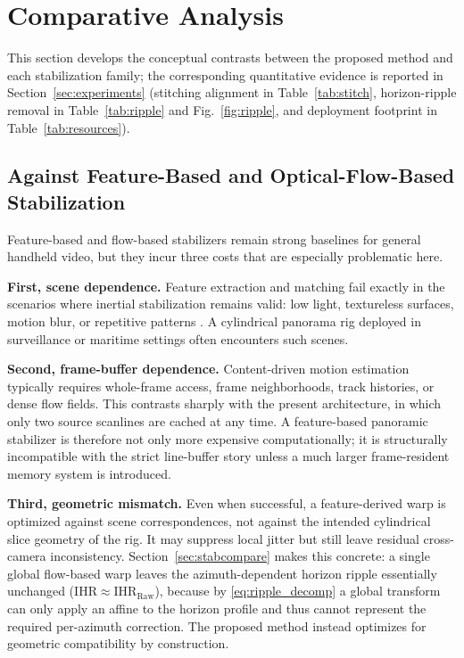 \documentclass[journal]{IEEEtran}
\begin{document}
\section{Comparative Analysis}
\label{sec:compare}
This section develops the conceptual contrasts between the proposed method and each stabilization family; the corresponding quantitative evidence is reported in Section~\ref{sec:experiments} (stitching alignment in Table~\ref{tab:stitch}, horizon-ripple removal in Table~\ref{tab:ripple} and Fig.~\ref{fig:ripple}, and deployment footprint in Table~\ref{tab:resources}).

\subsection{Against Feature-Based and Optical-Flow-Based Stabilization}
Feature-based and flow-based stabilizers remain strong baselines for general handheld video, but they incur three costs that are especially problematic here.

\textbf{First, scene dependence.} Feature extraction and matching fail exactly in the scenarios where inertial stabilization remains valid: low light, textureless surfaces, motion blur, or repetitive patterns \cite{karpenko2011gyro,shi2022deepfvs}. A cylindrical panorama rig deployed in surveillance or maritime settings often encounters such scenes.

\textbf{Second, frame-buffer dependence.} Content-driven motion estimation typically requires whole-frame access, frame neighborhoods, track histories, or dense flow fields. This contrasts sharply with the present architecture, in which only two source scanlines are cached at any time. A feature-based panoramic stabilizer is therefore not only more expensive computationally; it is structurally incompatible with the strict line-buffer story unless a much larger frame-resident memory system is introduced.

\textbf{Third, geometric mismatch.} Even when successful, a feature-derived warp is optimized against scene correspondences, not against the intended cylindrical slice geometry of the rig. It may suppress local jitter but still leave residual cross-camera inconsistency. Section~\ref{sec:stabcompare} makes this concrete: a single global flow-based warp leaves the azimuth-dependent horizon ripple essentially unchanged ($\mathrm{IHR}\!\approx\!\mathrm{IHR}_{\text{Raw}}$), because by \eqref{eq:ripple_decomp} a global transform can only apply an affine to the horizon profile and thus cannot represent the required per-azimuth correction. The proposed method instead optimizes for geometric compatibility by construction.
\end{document}
